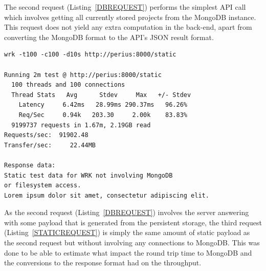 \documentclass[a4paper,12pt]{article}
\newenvironment{custommargins}[2]%
  {\addtolength{\leftskip}{#1}\addtolength{\rightskip}{#2}}{\par}
\begin{document}
\par
The second request (Listing~\ref{DBREQUEST}) performs the simplest API call which involves getting
all currently stored projects from the MongoDB instance. This request does not yield any extra
computation in the back-end, apart from converting the MongoDB format to the API's JSON result
format.

\newpage
\begin{custommargins}{0cm}{-2cm}
\begin{minipage}{\linewidth-1cm}
\begin{lstlisting}[label=STATICREQUEST,caption=Result of static text requests]
wrk -t100 -c100 -d10s http://perius:8000/static

Running 2m test @ http://perius:8000/static
  100 threads and 100 connections
  Thread Stats   Avg      Stdev     Max   +/- Stdev
    Latency     6.42ms   28.99ms 290.37ms   96.26%
    Req/Sec     0.94k   203.30     2.00k    83.83%
  9199737 requests in 1.67m, 2.19GB read
Requests/sec:  91902.48
Transfer/sec:     22.44MB

Response data:
Static test data for WRK not involving MongoDB 
or filesystem access. 
Lorem ipsum dolor sit amet, consectetur adipiscing elit.
\end{lstlisting}
\end{minipage}
\end{custommargins}

\par
As the second request (Listing~\ref{DBREQUEST}) involves the server answering with some payload that
is generated from the persistent storage, the third request (Listing~\ref{STATICREQUEST}) is simply
the same amount of static payload as the second request but without involving any connections to
MongoDB. This was done to be able to estimate what impact the round trip time to MongoDB and the
conversions to the response format had on the throughput.
\end{document}
